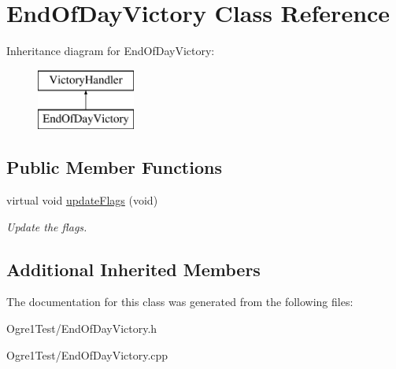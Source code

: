 \hypertarget{class_end_of_day_victory}{}\section{End\+Of\+Day\+Victory Class Reference}
\label{class_end_of_day_victory}
Inheritance diagram for End\+Of\+Day\+Victory\+:\begin{figure}[H]
\begin{center}
\leavevmode
\includegraphics[height=2.000000cm]{class_end_of_day_victory}
\end{center}
\end{figure}
\subsection*{Public Member Functions}
\begin{DoxyCompactItemize}
\item 
virtual void \hyperlink{class_end_of_day_victory_a2743b672f7f299fd59abad9a8233f6bc}{update\+Flags} (void)\hypertarget{class_end_of_day_victory_a2743b672f7f299fd59abad9a8233f6bc}{}\label{class_end_of_day_victory_a2743b672f7f299fd59abad9a8233f6bc}

\begin{DoxyCompactList}\small\item\em Update the flags. \end{DoxyCompactList}\end{DoxyCompactItemize}
\subsection*{Additional Inherited Members}


The documentation for this class was generated from the following files\+:\begin{DoxyCompactItemize}
\item 
Ogre1\+Test/End\+Of\+Day\+Victory.\+h\item 
Ogre1\+Test/End\+Of\+Day\+Victory.\+cpp\end{DoxyCompactItemize}
